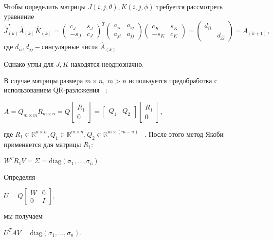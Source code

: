 Чтобы определить матрицы $J(i,j,\theta), K(i,j,\phi)$ требуется рассмотреть уравнение
\begin{equation}
    \hat{J}_{(k)}^T\hat{A}_{(k)}\hat{K}_{(k)} = \begin{pmatrix}
        c_J&s_J\\
        -s_J&c_J
    \end{pmatrix}^T
    \begin{pmatrix}
        a_{ii}&a_{ij}\\
        a_{ji}&a_{jj}
    \end{pmatrix}
    \begin{pmatrix}
        c_K&s_K\\
        -s_K&c_K
    \end{pmatrix} = \begin{pmatrix}
        d_{ii} &\\
        &d_{jj}
    \end{pmatrix} = A_{(k+1)},
\end{equation}
где $d_{ii}, d_{jj} -\text{сингулярные числа } \hat{A}_{(k)}$

Однако углы для $J, K$ находятся неоднозначно.

В случае матрицы размера $m \times n, \ m>n$ используется предобработка с использованием QR-разложения ~\cite{10.5555/867597}: 
\begin{center}
    $A = Q_{m\times m}R_{m\times n} = Q\begin{bmatrix}
        R_1\\0
    \end{bmatrix} = \begin{bmatrix}
        Q_1&Q_2
    \end{bmatrix}
    \begin{bmatrix}
        R_1\\0
    \end{bmatrix},
    $
\end{center}
где $R_1 \in \mathbb{R}^{n\times n}, Q_1 \in \mathbb{R}^{m\times n}, Q_2\in \mathbb{R}^{m\times (m-n)}$ ~\cite{Golub2013}. После этого метод Якоби применяется для матрицы $R_1$:
\begin{center}
    $W^TR_1V=\Sigma = \mathrm{diag(\sigma_1,...,\sigma_n)}$.
\end{center}
Определяя 
\begin{center}
    $U = Q\begin{bmatrix}
        W&0\\0&I
    \end{bmatrix},$    
\end{center}
мы получаем
\begin{center}
     $U^TAV = \mathrm{diag}(\sigma_1,...,\sigma_n)$.
\end{center}


